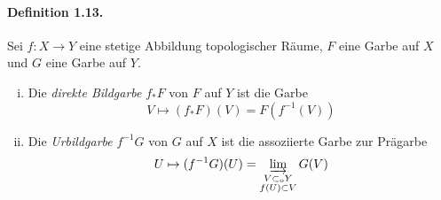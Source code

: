 \documentclass[11pt,b5paper,openany]{memoir}
\begin{document}
\paragraph{Definition 1.13.}\label{1.13} Sei $f:X\to Y$ eine stetige Abbildung topologischer Räume, $F$ eine Garbe auf $X$ und $G$ eine Garbe auf $Y$.
\begin{enumerate}[(i)]
\item Die \textit{direkte Bildgarbe} $f_\ast F$ von $F$ auf $Y$ ist die Garbe
\[V\mapsto (f_\ast F)(V)=F(f^{-1}(V)) \]
\item Die \textit{Urbildgarbe} $f^{-1}G$ von $G$ auf $X$ ist die assoziierte Garbe zur Prägarbe
\[U\mapsto (f^{-1}G)(U)= \varinjlim_{\substack{V\subset_\text{o}Y\\ f(U)\subset V}}G(V) \]
\end{enumerate}
\end{document}
